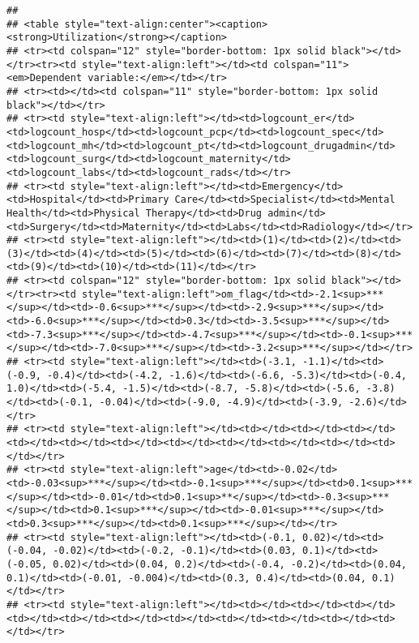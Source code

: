 \documentclass[]{article}
\begin{document}
\begin{verbatim}
## 
## <table style="text-align:center"><caption><strong>Utilization</strong></caption>
## <tr><td colspan="12" style="border-bottom: 1px solid black"></td></tr><tr><td style="text-align:left"></td><td colspan="11"><em>Dependent variable:</em></td></tr>
## <tr><td></td><td colspan="11" style="border-bottom: 1px solid black"></td></tr>
## <tr><td style="text-align:left"></td><td>logcount_er</td><td>logcount_hosp</td><td>logcount_pcp</td><td>logcount_spec</td><td>logcount_mh</td><td>logcount_pt</td><td>logcount_drugadmin</td><td>logcount_surg</td><td>logcount_maternity</td><td>logcount_labs</td><td>logcount_rads</td></tr>
## <tr><td style="text-align:left"></td><td>Emergency</td><td>Hospital</td><td>Primary Care</td><td>Specialist</td><td>Mental Health</td><td>Physical Therapy</td><td>Drug admin</td><td>Surgery</td><td>Maternity</td><td>Labs</td><td>Radiology</td></tr>
## <tr><td style="text-align:left"></td><td>(1)</td><td>(2)</td><td>(3)</td><td>(4)</td><td>(5)</td><td>(6)</td><td>(7)</td><td>(8)</td><td>(9)</td><td>(10)</td><td>(11)</td></tr>
## <tr><td colspan="12" style="border-bottom: 1px solid black"></td></tr><tr><td style="text-align:left">om_flag</td><td>-2.1<sup>***</sup></td><td>-0.6<sup>***</sup></td><td>-2.9<sup>***</sup></td><td>-6.0<sup>***</sup></td><td>0.3</td><td>-3.5<sup>***</sup></td><td>-7.3<sup>***</sup></td><td>-4.7<sup>***</sup></td><td>-0.1<sup>***</sup></td><td>-7.0<sup>***</sup></td><td>-3.2<sup>***</sup></td></tr>
## <tr><td style="text-align:left"></td><td>(-3.1, -1.1)</td><td>(-0.9, -0.4)</td><td>(-4.2, -1.6)</td><td>(-6.6, -5.3)</td><td>(-0.4, 1.0)</td><td>(-5.4, -1.5)</td><td>(-8.7, -5.8)</td><td>(-5.6, -3.8)</td><td>(-0.1, -0.04)</td><td>(-9.0, -4.9)</td><td>(-3.9, -2.6)</td></tr>
## <tr><td style="text-align:left"></td><td></td><td></td><td></td><td></td><td></td><td></td><td></td><td></td><td></td><td></td><td></td></tr>
## <tr><td style="text-align:left">age</td><td>-0.02</td><td>-0.03<sup>***</sup></td><td>-0.1<sup>***</sup></td><td>0.1<sup>***</sup></td><td>-0.01</td><td>0.1<sup>**</sup></td><td>-0.3<sup>***</sup></td><td>0.1<sup>***</sup></td><td>-0.01<sup>***</sup></td><td>0.3<sup>***</sup></td><td>0.1<sup>***</sup></td></tr>
## <tr><td style="text-align:left"></td><td>(-0.1, 0.02)</td><td>(-0.04, -0.02)</td><td>(-0.2, -0.1)</td><td>(0.03, 0.1)</td><td>(-0.05, 0.02)</td><td>(0.04, 0.2)</td><td>(-0.4, -0.2)</td><td>(0.04, 0.1)</td><td>(-0.01, -0.004)</td><td>(0.3, 0.4)</td><td>(0.04, 0.1)</td></tr>
## <tr><td style="text-align:left"></td><td></td><td></td><td></td><td></td><td></td><td></td><td></td><td></td><td></td><td></td><td></td></tr>

\end{verbatim}
\end{document}
